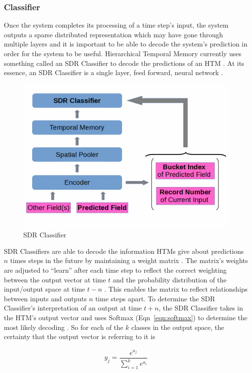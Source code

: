 \documentclass[oneside,12pt,openany]{book}
\begin{document}
	\subsubsection{Classifier}
	
	Once the system completes its processing of a time step's input, the system outputs a sparse distributed representation which may have gone through multiple layers and it is important to be able to decode the system's prediction in order for the system to be useful. Hierarchical Temporal Memory currently uses something called an SDR Classifier to decode the predictions of an HTM \cite{Dillon}. At its essence, an SDR Classifier is a single layer, feed forward, neural network \cite{Dillon}.
	
	\begin{figure}[hbt!]
		\centering
		\includegraphics[width=.6\linewidth]{images/SDRClassifier.jpg}
		\caption{SDR Classifier}
		\label{fig:SDRClassifier}
	\end{figure}
	
	SDR Classifiers are able to decode the information HTMs give about predictions $n$ times steps in the future by maintaining a weight matrix \cite{Dillon}. The matrix's weights are adjusted to ``learn'' after each time step to reflect the correct weighting between the output vector at time $t$ and the probability distribution of the input/output space at time $t-n$ \cite{Dillon}. This enables the matrix to reflect relationships between inputs and outputs $n$ time steps apart. To determine the SDR Classifier's interpretation of an output at time $t+n$, the SDR Classifier takes in the HTM's output vector and uses Softmax (Eqn~\ref{eqn:softmax}) to determine the most likely decoding \cite{Dillon}. So for each of the $k$ classes in the output space, the certainty that the output vector is referring to it is 
	
	\begin{align}
	\label{eqn:softmax}
	y_{j} = \dfrac{e^{a_{j}}}{\sum_{i=1}^{k} e^{a_{i}}}
	\end{align}
	
\end{document}
